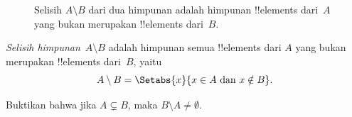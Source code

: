 \documentclass[../../../include/open-logic-section]{subfiles}
\begin{document}
\begin{figure}
  \caption{Selisih $A \setminus B$ dari dua himpunan adalah himpunan
    !!{element}s dari~$A$ yang bukan merupakan !!{element}s dari~$B$.}
\end{figure}

\begin{defn}[Selisih]
\emph{Selisih himpunan}~$A \setminus B$ adalah himpunan semua
!!{element}s dari $A$ yang bukan merupakan !!{element}s dari~$B$,
yaitu
\[
A\setminus B = \Setabs{x}{x\in A \text{ dan } x \notin B}.
\]
\end{defn}

\begin{prob}
	Buktikan bahwa jika $A \subsetneq B$, maka
	$B \setminus A \neq \emptyset$.
\end{prob}
\end{document}

